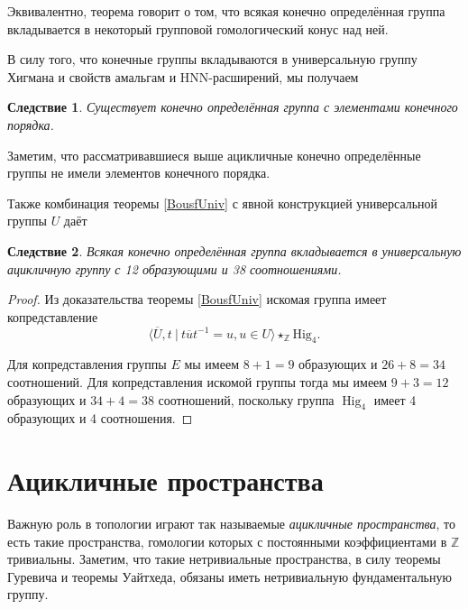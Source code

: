 \documentclass[14pt, dvipsnames]{extarticle}
\newtheorem{corollary}{Следствие}[theorem]
\theoremstyle{definition}
\theoremstyle{remark}
\DeclareMathOperator{\Hig}{\mathrm{Hig}}
\begin{document}
Эквивалентно, теорема говорит о том, что всякая конечно определённая группа вкладывается в некоторый групповой гомологический конус над ней. 

В силу того, что конечные группы вкладываются в универсальную группу Хигмана и свойств амальгам и HNN-расширений, мы получаем 

\begin{corollary}
Существует конечно определённая группа с элементами конечного порядка.
\end{corollary}

Заметим, что рассматривавшиеся выше ацикличные конечно определённые группы не имели элементов конечного порядка. 

Также комбинация теоремы \ref{BousfUniv} с явной конструкцией универсальной группы $U$ даёт

\begin{corollary}
Всякая конечно определённая группа вкладывается в универсальную ацикличную группу с 12 образующими и 38 соотношениями.
\end{corollary}  

\begin{proof}
Из доказательства теоремы \ref{BousfUniv} искомая группа имеет копредставление $$\langle \overline{U}, t\ |\ t\overline{u}t^{-1} = u, u\in U  \rangle\star_{\mathbb{Z}} \mathrm{Hig}_4.$$

Для копредставления группы $E$ мы имеем $8 + 1 = 9$ образующих и $26 + 8 = 34$ соотношений. Для копредставления искомой группы тогда мы имеем $9 + 3 = 12$ образующих и $34 + 4 = 38$ соотношений, поскольку группа $\Hig_4$ имеет 4 образующих и 4 соотношения. 
\end{proof}


 













\section{Ацикличные пространства}


Важную роль в топологии играют так называемые {\it ацикличные пространства}, то есть такие пространства, гомологии которых с постоянными коэффициентами в $\mathbb{Z}$ тривиальны. Заметим, что такие нетривиальные пространства, в силу теоремы Гуревича и теоремы Уайтхеда, обязаны иметь нетривиальную фундаментальную группу.
\end{document}
